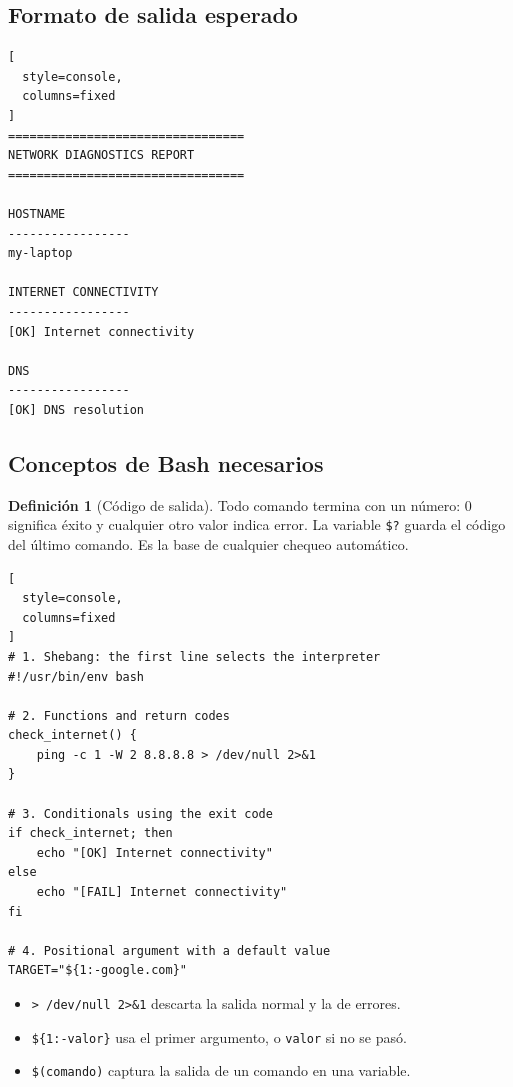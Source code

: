 \documentclass[11pt,a4paper]{article}
\theoremstyle{definition}
\newtheorem{definicion}{Definición}[section]
\theoremstyle{remark}
\begin{document}
\subsection{Formato de salida esperado}

\begin{lstlisting}[
  style=console,
  columns=fixed
]
=================================
NETWORK DIAGNOSTICS REPORT
=================================

HOSTNAME
-----------------
my-laptop

INTERNET CONNECTIVITY
-----------------
[OK] Internet connectivity

DNS
-----------------
[OK] DNS resolution
\end{lstlisting}

\subsection{Conceptos de Bash necesarios}

\begin{definicion}[Código de salida]
Todo comando termina con un número: $0$ significa éxito y cualquier otro valor indica error. La variable \verb|$?| guarda el código del último comando. Es la base de cualquier chequeo automático.
\end{definicion}

\begin{lstlisting}[
  style=console,
  columns=fixed
]
# 1. Shebang: the first line selects the interpreter
#!/usr/bin/env bash

# 2. Functions and return codes
check_internet() {
    ping -c 1 -W 2 8.8.8.8 > /dev/null 2>&1
}

# 3. Conditionals using the exit code
if check_internet; then
    echo "[OK] Internet connectivity"
else
    echo "[FAIL] Internet connectivity"
fi

# 4. Positional argument with a default value
TARGET="${1:-google.com}"
\end{lstlisting}

\begin{itemize}
  \item \verb|> /dev/null 2>&1| descarta la salida normal y la de errores.
  \item \verb|${1:-valor}| usa el primer argumento, o \texttt{valor} si no se pasó.
  \item \verb|$(comando)| captura la salida de un comando en una variable.
\end{itemize}
\end{document}
